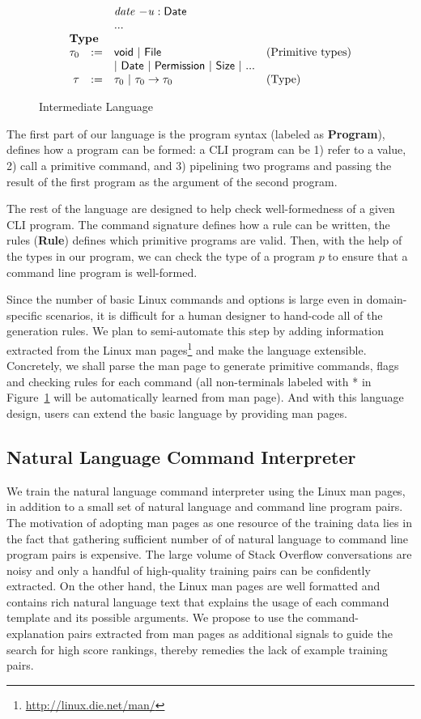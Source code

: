 \begin{figure}
\[\begin{array}{rlll}
                  &  & \mathit{date}~\mathit{-u} : \mathsf{Date}\\
                  &  & ...\\
\multicolumn{3}{l}{\textbf{Type}}\\
\tau_0 & := & \mathsf{void} ~|~ \mathsf{File} & \textrm{(Primitive types)}\\
       &     & |~ \mathsf{Date} ~|~ \mathsf{Permission} ~|~ \mathsf{Size} ~|~ ... \\
\tau & := & \tau_0 ~|~ \tau_0\rightarrow \tau_0 & \textrm{(Type)}
\end{array}
\]
\caption{Intermediate Language}
\label{fig:lang}
\end{figure}


The first part of our language is the program syntax (labeled as \textbf{Program}), defines how a program can be formed: a CLI program can be 1) refer to a value, 2) call a primitive command, and 3) pipelining two programs and passing the result of the first program as the argument of the second program.

The rest of the language are designed to help check well-formedness of a given CLI program. The command signature defines how a rule can be written, the rules (\textbf{Rule}) defines which primitive programs are valid. Then, with the help of the types in our program, we can check the type of a program $p$ to ensure that a command line program is well-formed.

Since the number of basic Linux commands and options is large even in domain-specific scenarios, it is difficult for a human designer to hand-code all of the generation rules. We plan to semi-automate this step by adding information extracted from the Linux man pages\footnote{\url{http://linux.die.net/man/}} and make the language extensible. Concretely, we shall parse the man page to generate primitive commands, flags and checking rules for each command (all non-terminals labeled with * in Figure~\ref{fig:lang} will be automatically learned from man page). And with this language design, users can extend the basic language by providing man pages.

\subsection{Natural Language Command Interpreter}
\label{subsec:parser}
We train the natural language command interpreter using the Linux man pages, in addition to a small set of natural language and command line program pairs. The motivation of adopting man pages as one resource of the training data lies in the fact that gathering sufficient number of of natural language to command line program pairs is expensive. The large volume of Stack Overflow conversations are noisy and only a handful of high-quality training pairs can be confidently extracted. On the other hand, the Linux man pages are well formatted and contains rich natural language text that explains the usage of each command template and its possible arguments. We propose to use the command-explanation pairs extracted from man pages as additional signals to guide the search for high score rankings, thereby remedies the lack of example training pairs.

